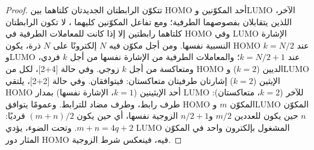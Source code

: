 \begin{proof}
تتكوّن الرابطتان الجديدتان كلتاهما بين HOMO أحد المكوّنين وLUMO
الآخر، اللذين يتقابلان بفصوصهما الطرفية؛ ومع تفاعل المكوّنين كليهما
، لا تكون الرابطتان كلتاهما رابطتين إلا إذا كانت للمعاملات الطرفية في
HOMO وفي LUMO الإشارة النسبية نفسها. ومن أجل مكوّن فيه $N$
إلكترونًا على $N$ ذرة، يكون HOMO عند $k = N/2$ وLUMO عند $k = N/2 + 1$؛ والمعاملات الطرفية من
الإشارة نفسها من أجل $k$ فردي، ومتعاكسة من أجل $k$ زوجي. وفي حالة [4+2]، لكل من HOMO الديين ($k = 2$)
وLUMO الإيثين ($k = 2$) إشارتان طرفيتان متعاكستان: فيتوافقان. وفي حالة
[2+2]، يلتقي HOMO أحد الإيثينين ($k = 1$، الإشارة نفسها) بمدار LUMO للآخر
($k = 2$، متعاكستان): طرف رابط، وطرف مضاد للترابط. وعمومًا يتوافق HOMO المكوّن $m$
وLUMO المكوّن $n$ حين يكون للعددين $m/2$ و$n/2 + 1$ الزوجية
نفسها، أي حين يكون $(m + n)/2$ فرديًا: $m + n = 4q + 2$. وتحت الضوء، يؤدي LUMO المشغول بإلكترون واحد في
المكوّن المثار دور HOMO فيه، فينعكس شرط الزوجية.
\end{proof}

